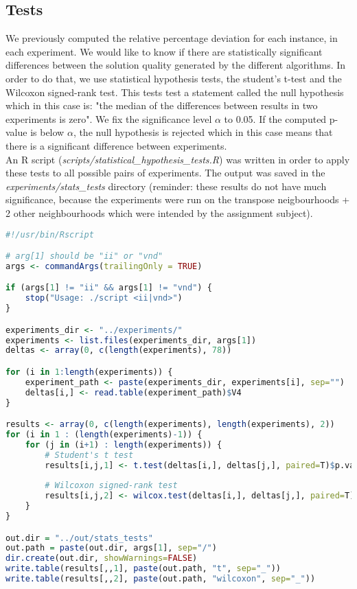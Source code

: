 \newpage

\subsection{Tests}
We previously computed the relative percentage deviation for each instance, in
each experiment. We would like to know if there are statistically significant
differences between the solution quality generated by the different algorithms.
In order to do that, we use statistical hypothesis tests, the student's t-test
and the Wilcoxon signed-rank test. This tests test a statement called the
null hypothesis which in this case is: "the median of the differences between
results in two experiments is zero". We fix the significance level $\alpha$ to
0.05. If the computed p-value is below $\alpha$, the null hypothesis is rejected
which in this case means that there is a significant difference between
experiments.\\

An R script (\emph{scripts/statistical\_hypothesis\_tests.R}) was written in order
to apply these tests to all possible pairs of experiments. The output was saved
in the \emph{experiments/stats\_tests} directory (reminder: these
results do not have much significance, because the experiments were run on
the transpose neigbourhoods + 2 other neighbourhoods which were intended by the
assignment subject).\\

\begin{lstlisting}[language=R]
#!/usr/bin/Rscript

# arg[1] should be "ii" or "vnd"
args <- commandArgs(trailingOnly = TRUE)

if (args[1] != "ii" && args[1] != "vnd") {
    stop("Usage: ./script <ii|vnd>")
}

experiments_dir <- "../experiments/"
experiments <- list.files(experiments_dir, args[1])
deltas <- array(0, c(length(experiments), 78))

for (i in 1:length(experiments)) {
    experiment_path <- paste(experiments_dir, experiments[i], sep="")
    deltas[i,] <- read.table(experiment_path)$V4
}

results <- array(0, c(length(experiments), length(experiments), 2))
for (i in 1 : (length(experiments)-1)) {
    for (j in (i+1) : length(experiments)) {
        # Student's t test
        results[i,j,1] <- t.test(deltas[i,], deltas[j,], paired=T)$p.value
        
        # Wilcoxon signed-rank test
        results[i,j,2] <- wilcox.test(deltas[i,], deltas[j,], paired=T)$p.value
    }
}

out.dir = "../out/stats_tests"
out.path = paste(out.dir, args[1], sep="/")
dir.create(out.dir, showWarnings=FALSE)
write.table(results[,,1], paste(out.path, "t", sep="_"))
write.table(results[,,2], paste(out.path, "wilcoxon", sep="_"))
\end{lstlisting}

\newpage
